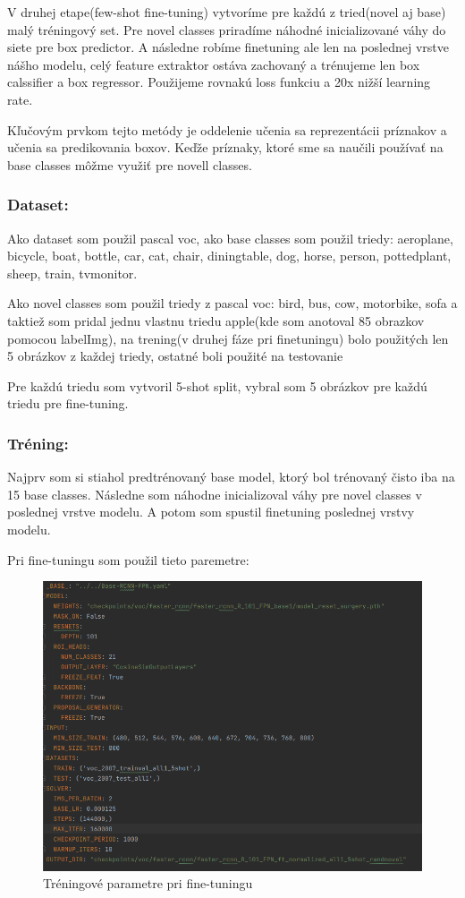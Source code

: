 V druhej etape(few-shot fine-tuning) vytvoríme pre každú z tried(novel aj base) malý tréningový set. Pre novel classes priradíme náhodné inicializované váhy do siete pre box predictor. A následne robíme finetuning ale len na poslednej vrstve nášho modelu, celý feature extraktor ostáva zachovaný a trénujeme len box calssifier a box regressor. Použijeme rovnakú loss funkciu a 20x
nižší learning rate.

Kľučovým prvkom tejto metódy je oddelenie učenia sa reprezentácii príznakov a učenia sa
predikovania boxov. Keďže príznaky, ktoré sme sa naučili používať na base classes môžme využiť
pre novell classes.

\subsubsection{Dataset:}
Ako dataset som použil pascal voc, ako base classes som použil triedy:
aeroplane, bicycle, boat, bottle, car, cat, chair, diningtable, dog, horse, person, pottedplant, sheep,
train, tvmonitor.

Ako novel classes som použil triedy z pascal voc:
bird, bus, cow, motorbike, sofa a taktiež som pridal jednu vlastnu triedu apple(kde som anotoval 85
obrazkov pomocou labelImg), na trening(v druhej fáze pri finetuningu) bolo použitých len 5
obrázkov z každej triedy, ostatné boli použité na testovanie

Pre každú triedu som vytvoril 5-shot split, vybral som 5 obrázkov pre každú triedu pre fine-tuning.

\subsubsection{Tréning:}
Najprv som si stiahol predtrénovaný base model, ktorý bol trénovaný čisto iba na 15 base classes.
Následne som náhodne inicializoval váhy pre novel classes v poslednej vrstve modelu. A potom
som spustil finetuning poslednej vrstvy modelu.

Pri fine-tuningu som použil tieto paremetre:

\begin{figure}[!hbt]
\includegraphics[width=\textwidth]{images/Training_parameters.png}
\caption{Tréningové parametre pri fine-tuningu}
\label{fig:image}
\end{figure}

